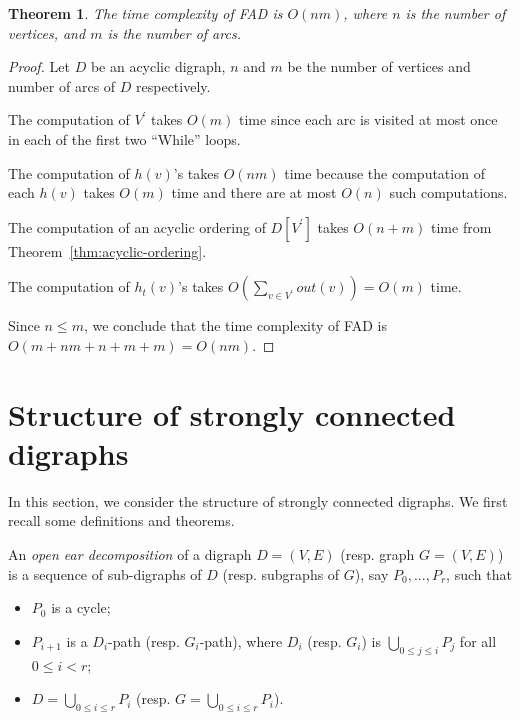 \documentclass{article}
\newtheorem{thm}{Theorem}
\begin{document}
\begin{thm}\label{thm:acyclic-complexity}
The time complexity of FAD is $O(nm)$, where $n$ is the number of
vertices, and $m$ is the number of arcs.
\end{thm}

\begin{proof}

Let $D$ be an acyclic digraph, $n$ and $m$ be the number of vertices
and number of arcs of $D$ respectively.

The computation of $V^\prime$ takes $O(m)$ time since each arc is
visited at most once in each of the first two ``While'' loops.

The computation of $h(v)$'s takes $O(nm)$ time because the
computation of each $h(v)$ takes $O(m)$ time and there are at most
$O(n)$ such computations.

The computation of an acyclic ordering of $D[V^\prime]$ takes
$O(n+m)$ time from Theorem~\ref{thm:acyclic-ordering}.

The computation of $h_t(v)$'s takes $O\left(\sum \limits_{v \in
V^\prime}out(v)\right)=O(m)$ time.

Since $n \le m$, we conclude that the time complexity of FAD is
$O(m+nm+n+m+m)=O(nm)$.
\end{proof}


\section{Structure of strongly connected digraphs}\label{sec:strong-structure}

In this section, we consider the structure of strongly connected
digraphs. We first recall some definitions and theorems.

An \emph{open ear decomposition} of a digraph $D=(V,E)$ (resp. graph
$G=(V,E)$) is a sequence of sub-digraphs of $D$ (resp. subgraphs of
$G$), say $P_0, ..., P_r$, such that
\begin{itemize}

\item $P_0$ is a cycle;

\item $P_{i+1}$ is a $D_i$-path (resp. $G_i$-path), where $D_i$ (resp. $G_i$) is $\bigcup \limits_{0 \le j \le i} P_j$ for all $0 \le i <
r$;

\item $D = \bigcup \limits_{0 \le i \le r}P_i$ (resp. $G = \bigcup \limits_{0 \le i \le r}P_i$).
\end{itemize}
\end{document}
